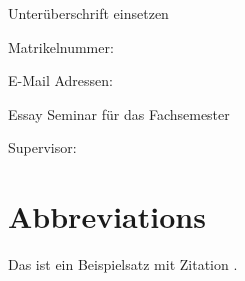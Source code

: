 \documentclass[parskip]{scrartcl}
\newcommand{\workauthor}{}
\newcommand{\worktitle}{}
\newcommand{\studentid}{}
\newcommand{\email}{}
\newcommand{\workyear}{}
\newcommand{\supervisor}{}
\begin{document}
\begin{titlepage}
    {
    {\vspace*{1cm}\Huge Unterüberschrift einsetzen}
    
    {\vspace{1cm}\Huge\worktitle{}}}
    
    
    {\Large \workauthor{}}
    
    Matrikelnummer: \studentid{}
    
    E-Mail Adressen: \email{}
    
    
    Essay Seminar für das \workyear{} Fachsemester
    
    Supervisor: \textbf{\supervisor{}}
    
    
  
    
\end{titlepage}


{\setlength{\parskip}{0.2cm}
\section*{Abbreviations}
    \begin{acronym}[LC-MS/MS23]
        
        
        
        
    \end{acronym}
}
\tableofcontents
\newpage
Das ist ein Beispielsatz mit Zitation \citep{Alberts.2015}.







\end{document}
